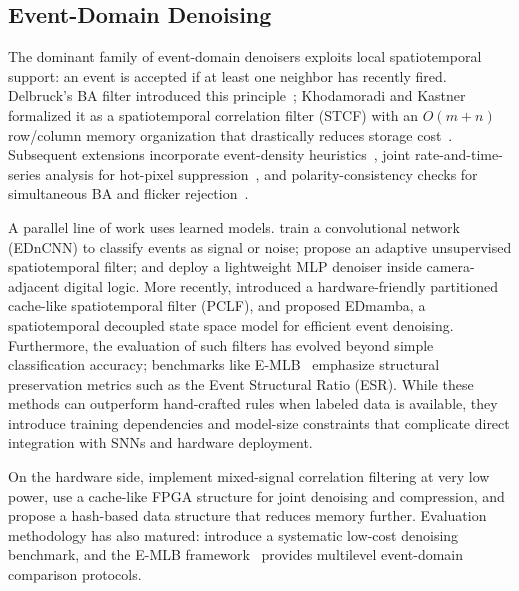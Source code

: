 \documentclass[a4paper,fleqn]{cas-dc}
\begin{document}
\subsection{Event-Domain Denoising}
\label{sec:related_denoising}

The dominant family of event-domain denoisers exploits local spatiotemporal support: an event is accepted if at least one neighbor has recently fired. Delbruck's BA filter introduced this principle~\citep{delbruck2008ba}; Khodamoradi and Kastner formalized it as a spatiotemporal correlation filter (STCF) with an $O(m{+}n)$ row/column memory organization that drastically reduces storage cost~\citep{khodamoradi2018onoise}. Subsequent extensions incorporate event-density heuristics~\citep{feng2020density}, joint rate-and-time-series analysis for hot-pixel suppression~\citep{li2024denoising_spatiotemp}, and polarity-consistency checks for simultaneous BA and flicker rejection~\citep{wu2025pfd}.

A parallel line of work uses learned models. \citet{baldwin2020epm} train a convolutional network (EDnCNN) to classify events as signal or noise; \citet{benmiled2024adaptive} propose an adaptive unsupervised spatiotemporal filter; and \citet{riosnavarro2023mlpf} deploy a lightweight MLP denoiser inside camera-adjacent digital logic. More recently, \citet{zhao2024pclf} introduced a hardware-friendly partitioned cache-like spatiotemporal filter (PCLF), and \citet{ruan2025edmamba} proposed EDmamba, a spatiotemporal decoupled state space model for efficient event denoising. Furthermore, the evaluation of such filters has evolved beyond simple classification accuracy; benchmarks like E-MLB~\citep{ding2023emlb} emphasize structural preservation metrics such as the Event Structural Ratio (ESR). While these methods can outperform hand-crafted rules when labeled data is available, they introduce training dependencies and model-size constraints that complicate direct integration with SNNs and hardware deployment.

On the hardware side, \citet{liu2019mixed} implement mixed-signal correlation filtering at very low power, \citet{zhao2024pclf} use a cache-like FPGA structure for joint denoising and compression, and \citet{gopalakrishnan2023hash} propose a hash-based data structure that reduces memory further. Evaluation methodology has also matured: \citet{guo2022low} introduce a systematic low-cost denoising benchmark, and the E-MLB framework~\citep{ding2024emlb} provides multilevel event-domain comparison protocols.
\end{document}
